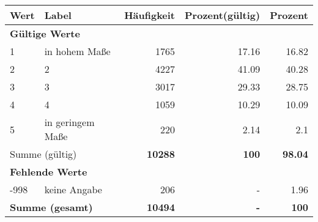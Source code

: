      \begin{longtable}{lXrrr}
     \toprule
     \textbf{Wert} & \textbf{Label} & \textbf{Häufigkeit} & \textbf{Prozent(gültig)} & \textbf{Prozent} \\
     \endhead
     \midrule
     \multicolumn{5}{l}{\textbf{Gültige Werte}}\\

     1 &
     \multicolumn{1}{X}{ in hohem Maße   } &


       \num{1765} &
       \num[round-mode=places,round-precision=2]{17.16} &
         \num[round-mode=places,round-precision=2]{16.82} \\

     2 &
     \multicolumn{1}{X}{ 2   } &


       \num{4227} &
       \num[round-mode=places,round-precision=2]{41.09} &
         \num[round-mode=places,round-precision=2]{40.28} \\

     3 &
     \multicolumn{1}{X}{ 3   } &


       \num{3017} &
       \num[round-mode=places,round-precision=2]{29.33} &
         \num[round-mode=places,round-precision=2]{28.75} \\

     4 &
     \multicolumn{1}{X}{ 4   } &


       \num{1059} &
       \num[round-mode=places,round-precision=2]{10.29} &
         \num[round-mode=places,round-precision=2]{10.09} \\

     5 &
     \multicolumn{1}{X}{ in geringem Maße   } &


       \num{220} &
       \num[round-mode=places,round-precision=2]{2.14} &
         \num[round-mode=places,round-precision=2]{2.1} \\
     \midrule
     \multicolumn{2}{l}{Summe (gültig)} &
       \textbf{\num{10288}} &
     \textbf{\num{100}} &
       \textbf{\num[round-mode=places,round-precision=2]{98.04}} \\
     \multicolumn{5}{l}{\textbf{Fehlende Werte}}\\
       -998 &
       keine Angabe &
         \num{206} &
        - &
         \num[round-mode=places,round-precision=2]{1.96} \\
     \midrule
     \multicolumn{2}{l}{\textbf{Summe (gesamt)}} &
          \textbf{\num{10494}} &
        \textbf{-} &
        \textbf{\num{100}} \\
     \bottomrule
     \end{longtable}
     
